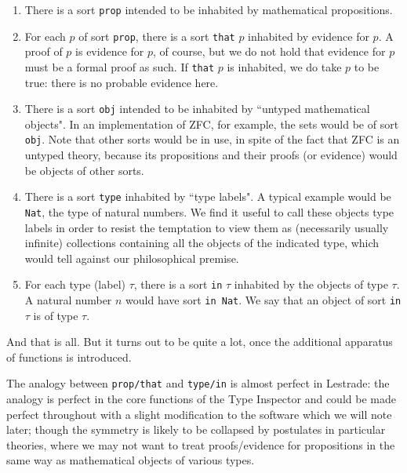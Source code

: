\documentclass[12pt]{article}
\begin{document}
\begin{enumerate}

\item  There is a sort {\tt prop} intended to be inhabited by mathematical propositions.

\item  For each $p$ of sort {\tt prop}, there is a sort {\tt that} $p$ inhabited by evidence for $p$.  A proof of $p$ is evidence for $p$, of course, but we do not hold that evidence for $p$ must be a formal proof as such.  If {\tt that} $p$ is inhabited, we do take $p$ to be true:  there is no probable evidence here.

\item  There is a sort {\tt obj} intended to be inhabited by ``untyped mathematical objects".  In an implementation of ZFC, for example, the sets would be of sort {\tt obj}.  Note that other sorts would be in use, in spite of the fact that ZFC is an untyped theory, because its propositions and their proofs (or evidence) would be objects of other sorts.

\item  There is a sort {\tt type} inhabited by ``type labels".  A typical example would be {\tt Nat}, the type of natural numbers.  We find it useful to call these objects type labels in order to resist the temptation to view them as (necessarily usually infinite) collections containing all the objects of the indicated type, which would tell against our philosophical premise.

\item  For each type (label) $\tau$, there is a sort {\tt in} $\tau$ inhabited by the objects of type $\tau$.  A natural number $n$ would have sort
{\tt in Nat}.  We say that an object of sort {\tt in} $\tau$ is of type $\tau$.  

\end{enumerate}




And that is all.  But it turns out to be quite a lot, once the additional apparatus of functions is introduced.

The analogy between {\tt prop/that} and {\tt type/in} is almost perfect in Lestrade:  the analogy is perfect in the core functions of the Type Inspector and could be made perfect throughout with a slight modification to the software which we will note later;  though the symmetry is likely to be collapsed by
postulates in particular theories, where we may not want to treat proofs/evidence for propositions in the same way as mathematical objects of various types.
\end{document}
